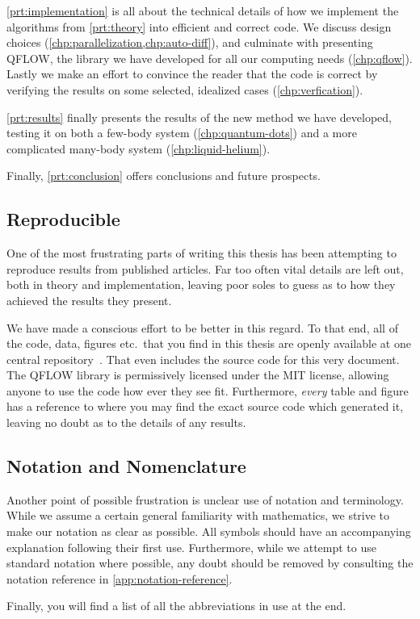 \documentclass[Thesis.tex]{subfiles}
\begin{document}
\cref{prt:implementation} is all about the technical details of how we implement
the algorithms from \cref{prt:theory} into efficient and correct code. We
discuss design choices (\cref{chp:parallelization,chp:auto-diff}), and culminate
with presenting QFLOW, the library we have
developed for all our computing needs (\cref{chp:qflow}). Lastly we make an effort to convince the
reader that the code is correct by verifying the results on some
selected, idealized cases (\cref{chp:verfication}).

\cref{prt:results} finally presents the results of the new method we have
developed, testing it on both a few-body system (\cref{chp:quantum-dots}) and a
more complicated many-body system (\cref{chp:liquid-helium}).

Finally, \cref{prt:conclusion} offers conclusions and future prospects.

\subsection*{Reproducible}

One of the most frustrating parts of writing this thesis has been attempting to
reproduce results from published articles. Far too often vital details are left
out, both in theory and implementation, leaving poor soles to guess as to how
they achieved the results they present.

We have made a conscious effort to be
better in this regard. To that end, all of the code, data, figures etc.\ that
you find in this thesis are openly available at one central
repository~\cite{qflow}. That even includes the source code for this very
document. The QFLOW library is permissively licensed under the MIT license,
allowing anyone to use the code how ever they see fit. Furthermore, \emph{every} table
and figure has a reference to where you may find the exact source code which
generated it, leaving no doubt as to the details of any results.

\subsection*{Notation and Nomenclature}

Another point of possible frustration is unclear use of notation and terminology. While we
assume a certain general familiarity with mathematics, we strive to make our
notation as clear as possible. All symbols should have an accompanying
explanation following their first use. Furthermore, while we attempt to use
standard notation where possible, any doubt should be removed by consulting the
notation reference in \cref{app:notation-reference}.

Finally, you will find a list of all the abbreviations in use at the end.
\end{document}
